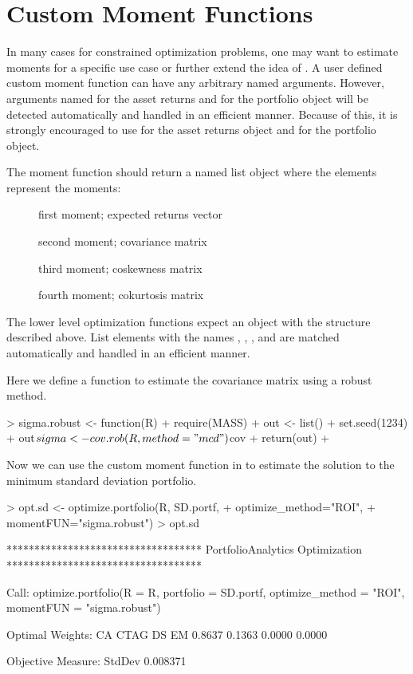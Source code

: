 \documentclass[a4paper]{article}
\begin{document}
\section{Custom Moment Functions}
In many cases for constrained optimization problems, one may want to estimate moments for a specific use case or further extend the idea of . A user defined custom moment function can have any arbitrary named arguments. However, arguments named  for the asset returns and  for the portfolio object will be detected automatically and handled in an efficient manner. Because of this, it is strongly encouraged to use  for the asset returns object and  for the portfolio object.

The moment function should return a named list object where the elements represent the moments:
\begin{description}
  \item[]{ first moment; expected returns vector}
  \item[]{ second moment; covariance matrix}
  \item[]{ third moment; coskewness matrix}
  \item[]{ fourth moment; cokurtosis matrix}
\end{description}

The lower level optimization functions expect an object with the structure described above. List elements with the names , , , and  are matched automatically and handled in an efficient manner.

Here we define a function to estimate the covariance matrix using a robust method.
\begin{Schunk}
\begin{Sinput}
> sigma.robust <- function(R){
+   require(MASS)
+   out <- list()
+   set.seed(1234)
+   out$sigma <- cov.rob(R, method="mcd")$cov
+   return(out)
+ }
\end{Sinput}
\end{Schunk}

Now we can use the custom moment function in  to estimate the solution to the minimum standard deviation portfolio.
\begin{Schunk}
\begin{Sinput}
> opt.sd <- optimize.portfolio(R, SD.portf, 
+                              optimize_method="ROI", 
+                              momentFUN="sigma.robust")
> opt.sd
\end{Sinput}
\begin{Soutput}
***********************************
PortfolioAnalytics Optimization
***********************************

Call:
optimize.portfolio(R = R, portfolio = SD.portf, optimize_method = "ROI", 
    momentFUN = "sigma.robust")

Optimal Weights:
    CA   CTAG     DS     EM 
0.8637 0.1363 0.0000 0.0000 

Objective Measure:
  StdDev 
0.008371 
\end{Soutput}
\end{Schunk}
\end{document}
